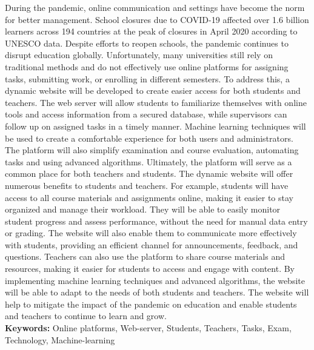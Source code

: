 During the pandemic, online communication and settings have become the norm for better management. School closures due to COVID-19 affected over 1.6 billion learners across 194 countries at the peak of closures in April 2020 according to UNESCO data. Despite efforts to reopen schools, the pandemic continues to disrupt education globally. Unfortunately, many universities still rely on traditional methods and do not effectively use online platforms for assigning tasks, submitting work, or enrolling in different semesters. To address this, a dynamic website will be developed to create easier access for both students and teachers. The web server will allow students to familiarize themselves with online tools and access information from a secured database, while supervisors can follow up on assigned tasks in a timely manner. Machine learning techniques will be used to create a comfortable experience for both users and administrators. The platform will also simplify examination and course evaluation, automating tasks and using advanced algorithms. Ultimately, the platform will serve as a common place for both teachers and students. The dynamic website will offer numerous benefits to students and teachers. For example, students will have access to all course materials and assignments online, making it easier to stay organized and manage their workload. They will be able to easily monitor student progress and assess performance, without the need for manual data entry or grading. The website will also enable them to communicate more effectively with students, providing an efficient channel for announcements, feedback, and questions. Teachers can also use the platform to share course materials and resources, making it easier for students to access and engage with content. By implementing machine learning techniques and advanced algorithms, the website will be able to adapt to the needs of both students and teachers. The website will help to mitigate the impact of the pandemic on education and enable students and teachers to continue to learn and grow.
\\
\vspace{3pt}
\textbf{Keywords:} Online platforms, Web-server, Students, Teachers, Tasks, Exam, Technology, Machine-learning

